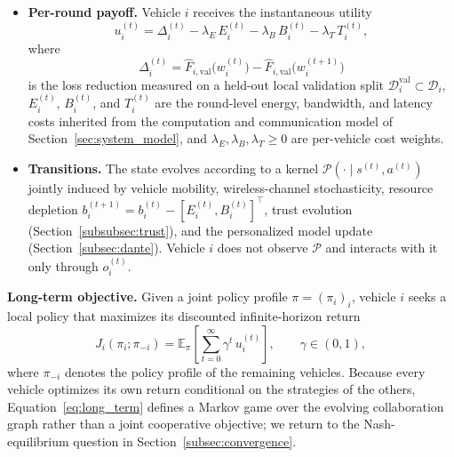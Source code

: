 \begin{definition}
\begin{itemize}
    \item \textbf{Per-round payoff.} Vehicle $i$ receives the instantaneous utility
    \begin{equation}
    \label{eq:stage_payoff}
        u_i^{(t)} = \Delta_i^{(t)} - \lambda_E\,E_i^{(t)} - \lambda_B\,B_i^{(t)} - \lambda_T\,T_i^{(t)},
    \end{equation}
    where
    \begin{equation*}
        \Delta_i^{(t)} = \widehat{F}_{i,\mathrm{val}}\!\bigl(w_i^{(t)}\bigr) - \widehat{F}_{i,\mathrm{val}}\!\bigl(w_i^{(t+1)}\bigr)
    \end{equation*}
    is the loss reduction measured on a held-out local validation split $\mathcal{D}_i^{\mathrm{val}}\subset\mathcal{D}_i$, $E_i^{(t)}$, $B_i^{(t)}$, and $T_i^{(t)}$ are the round-level energy, bandwidth, and latency costs inherited from the computation and communication model of Section~\ref{sec:system_model}, and $\lambda_E,\lambda_B,\lambda_T\ge 0$ are per-vehicle cost weights.

    \item \textbf{Transitions.} The state evolves according to a kernel $\mathcal{P}(\cdot\mid s^{(t)},a^{(t)})$ jointly induced by vehicle mobility, wireless-channel stochasticity, resource depletion $b_i^{(t+1)}=b_i^{(t)}-[E_i^{(t)},B_i^{(t)}]^\top$, trust evolution (Section~\ref{subsubsec:trust}), and the personalized model update (Section~\ref{subsec:dante}). Vehicle $i$ does not observe $\mathcal{P}$ and interacts with it only through $o_i^{(t)}$.
\end{itemize}
\end{definition}

\noindent\textbf{Long-term objective.} Given a joint policy profile $\pi=(\pi_i)_i$, vehicle $i$ seeks a local policy that maximizes its discounted infinite-horizon return
\begin{equation}
\label{eq:long_term}
    J_i(\pi_i;\pi_{-i}) = \mathbb{E}_{\pi}\!\left[\sum_{t=0}^{\infty}\gamma^{t}\,u_i^{(t)}\right],\qquad \gamma\in(0,1),
\end{equation}
where $\pi_{-i}$ denotes the policy profile of the remaining vehicles. Because every vehicle optimizes its own return conditional on the strategies of the others, Equation~\eqref{eq:long_term} defines a Markov game over the evolving collaboration graph rather than a joint cooperative objective; we return to the Nash-equilibrium question in Section~\ref{subsec:convergence}.

